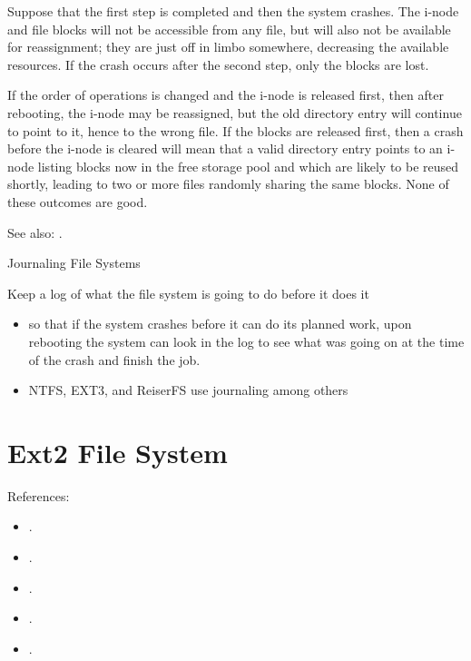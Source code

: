 Suppose that the first step is completed and then the system crashes. The i-node and file
blocks will not be accessible from any file, but will also not be available for
reassignment; they are just off in limbo somewhere, decreasing the available resources. If
the crash occurs after the second step, only the blocks are lost.

If the order of operations is changed and the i-node is released first, then after
rebooting, the i-node may be reassigned, but the old directory entry will continue to
point to it, hence to the wrong file. If the blocks are released first, then a crash
before the i-node is cleared will mean that a valid directory entry points to an i-node
listing blocks now in the free storage pool and which are likely to be reused shortly,
leading to two or more files randomly sharing the same blocks. None of these outcomes are
good.

See also: .

\begin{frame}{Journaling File Systems}
    \begin{block}{Keep a log of what the file system is going to do before it does it}
    \begin{itemize}
    \item so that if the system crashes before it can do its planned work, upon rebooting
      the system can look in the log to see what was going on at the time of the crash and
      finish the job.
    \item NTFS, EXT3, and ReiserFS use journaling among others
    \end{itemize}
  \end{block}
\end{frame}

\section{Ext2 File System}

References:
\begin{itemize}
\item {}.
\item {}.
\item {}.
\item {}.
\item {}.
\end{itemize}

